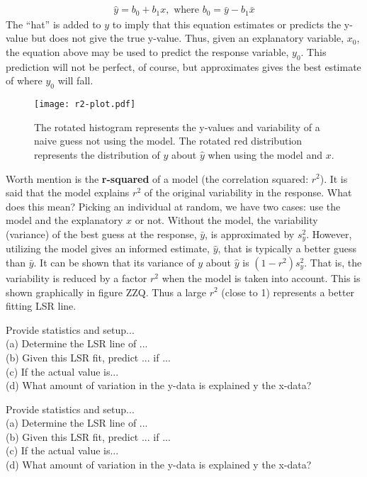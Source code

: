 \begin{eqnarray*}
\hat{y} = b_0 + b_1x,\text{ where }b_0 = \bar{y} - b_1\bar{x}
\end{eqnarray*}
The ``hat'' is added to $y$ to imply that this equation estimates or predicts the y-value but does not give the true y-value. Thus, given an explanatory variable, $x_0$, the equation above may be used to predict the response variable, $y_0$. This prediction will not be perfect, of course, but approximates gives the best estimate of where $y_0$ will fall.
\begin{figure}[htp]
\centering
\texttt{[image: r2-plot.pdf]}
\caption{The rotated histogram represents the y-values and variability of a naive guess not using the model. The rotated red distribution represents the distribution of $y$ about $\hat{y}$ when using the model and $x$.} %
\end{figure}

Worth mention is the \textbf{r-squared} of a model (the correlation squared: $r^2$). It is said that the model explains $r^2$ of the original variability in the response. What does this mean? Picking an individual at random, we have two cases: use the model and the explanatory $x$ or not. Without the model, the variability (variance) of the best guess at the response, $\bar{y}$, is approximated by $s_y^2$. However, utilizing the model gives an informed estimate, $\hat{y}$, that is typically a better guess than $\bar{y}$. It can be shown that its variance of $y$ about $\hat{y}$ is $(1-r^2)s_y^2$. That is, the variability is reduced by a factor $r^2$ when the model is taken into account. This is shown graphically in figure ZZQ. Thus a large $r^2$ (close to 1) represents a better fitting LSR line. \\

\begin{example}
Provide statistics and setup... \\
(a) Determine the LSR line of ... \\
(b) Given this LSR fit, predict ... if ... \\
(c) If the actual value is... \\
(d) What amount of variation in the y-data is explained y the x-data?
\end{example}

\begin{example}
Provide statistics and setup... \\
(a) Determine the LSR line of ... \\
(b) Given this LSR fit, predict ... if ... \\
(c) If the actual value is... \\
(d) What amount of variation in the y-data is explained y the x-data?
\end{example}

